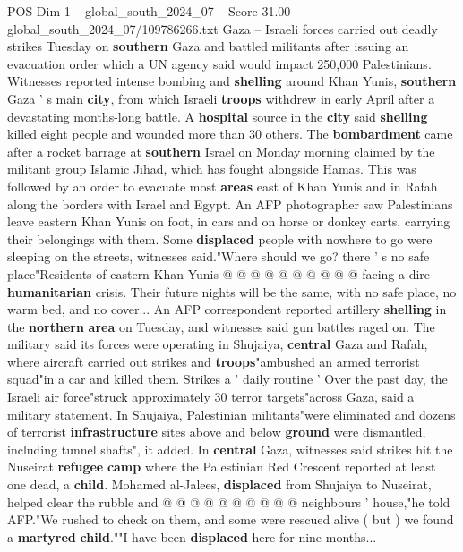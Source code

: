 \begin{textsample}{POS Dim 1 – global\_south\_2024\_07 – Score 31.00 – global\_south\_2024\_07/109786266.txt}  \label{ex:f1_pos_176}
Gaza -- Israeli forces carried out deadly strikes Tuesday on \textbf{southern} Gaza and battled militants after issuing an evacuation order which a UN agency said would impact 250,000 Palestinians.
Witnesses reported intense bombing and \textbf{shelling} around Khan Yunis, \textbf{southern} Gaza ' s main \textbf{city}, from which Israeli \textbf{troops} withdrew in early April after a devastating months-long battle.
A \textbf{hospital} source in the \textbf{city} said \textbf{shelling} killed eight people and wounded more than 30 others.
The \textbf{bombardment} came after a rocket barrage at \textbf{southern} Israel on Monday morning claimed by the militant group Islamic Jihad, which has fought alongside Hamas.
This was followed by an order to evacuate most \textbf{areas} east of Khan Yunis and in Rafah along the borders with Israel and Egypt.
An AFP photographer saw Palestinians leave eastern Khan Yunis on foot, in cars and on horse or donkey carts, carrying their belongings with them.
Some \textbf{displaced} people with nowhere to go were sleeping on the streets, witnesses said."Where should we go? there ' s no safe place"Residents of eastern Khan Yunis @ @ @ @ @ @ @ @ @ @ facing a dire \textbf{humanitarian} crisis.
Their future nights will be the same, with no safe place, no warm bed, and no cover...
An AFP correspondent reported artillery \textbf{shelling} in the \textbf{northern} \textbf{area} on Tuesday, and witnesses said gun battles raged on.
The military said its forces were operating in Shujaiya, \textbf{central} Gaza and Rafah, where aircraft carried out strikes and \textbf{troops}"ambushed an armed terrorist squad"in a car and killed them.
Strikes a ' daily routine ' Over the past day, the Israeli air force"struck approximately 30 terror targets"across Gaza, said a military statement.
In Shujaiya, Palestinian militants"were eliminated and dozens of terrorist \textbf{infrastructure} sites above and below \textbf{ground} were dismantled, including tunnel shafts", it added.
In \textbf{central} Gaza, witnesses said strikes hit the Nuseirat \textbf{refugee} \textbf{camp} where the Palestinian Red Crescent reported at least one dead, a \textbf{child}.
Mohamed al-Jalees, \textbf{displaced} from Shujaiya to Nuseirat, helped clear the rubble and @ @ @ @ @ @ @ @ @ @ neighbours ' house,"he told AFP."We rushed to check on them, and some were rescued alive ( but ) we found a \textbf{martyred} \textbf{child}.""I have been \textbf{displaced} here for nine months...

\end{textsample}
